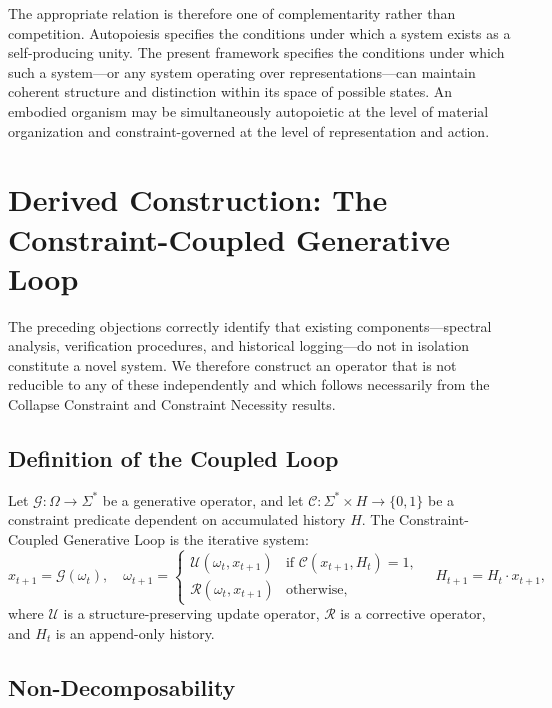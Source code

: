 \documentclass[12pt, a4paper]{article}
\theoremstyle{plain}
\theoremstyle{definition}
\theoremstyle{remark}
\begin{document}
The appropriate relation is therefore one of complementarity rather than competition. Autopoiesis specifies the conditions under which a system exists as a self-producing unity. The present framework specifies the conditions under which such a system---or any system operating over representations---can maintain coherent structure and distinction within its space of possible states. An embodied organism may be simultaneously autopoietic at the level of material organization and constraint-governed at the level of representation and action.

\section{Derived Construction: The Constraint-Coupled Generative Loop}

The preceding objections correctly identify that existing components---spectral analysis, verification procedures, and historical logging---do not in isolation constitute a novel system. We therefore construct an operator that is not reducible to any of these independently and which follows necessarily from the Collapse Constraint and Constraint Necessity results.

\subsection{Definition of the Coupled Loop}

Let $\mathcal{G} : \Omega \to \Sigma^*$ be a generative operator, and let $\mathcal{C} : \Sigma^* \times H \to \{0,1\}$ be a constraint predicate dependent on accumulated history $H$. The Constraint-Coupled Generative Loop is the iterative system:
\[
x_{t+1} = \mathcal{G}(\omega_t), \quad
\omega_{t+1} =
\begin{cases}
\mathcal{U}(\omega_t, x_{t+1}) & \text{if } \mathcal{C}(x_{t+1}, H_t) = 1, \\
\mathcal{R}(\omega_t, x_{t+1}) & \text{otherwise},
\end{cases}
\quad H_{t+1} = H_t \cdot x_{t+1},
\]
where $\mathcal{U}$ is a structure-preserving update operator, $\mathcal{R}$ is a corrective operator, and $H_t$ is an append-only history.

\subsection{Non-Decomposability}
\end{document}
